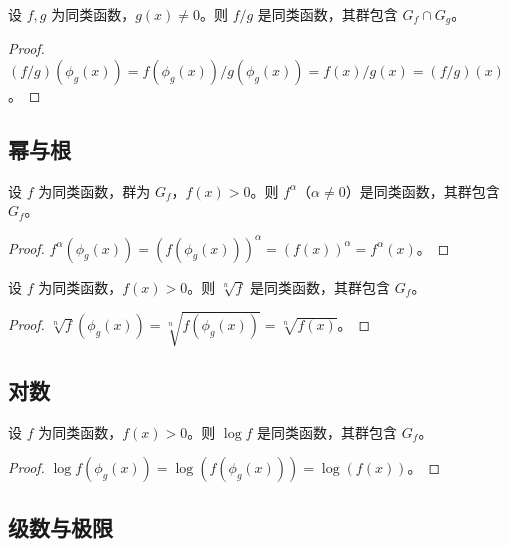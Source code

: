 \begin{proposition}[除法下各性质的传递性]\label{prop:division_all}
设 $f, g$ 为同类函数，$g(x) \neq 0$。则 $f/g$ 是同类函数，其群包含 $G_f \cap G_g$。
\end{proposition}

\begin{proof}
$(f/g)(\phi_g(x)) = f(\phi_g(x))/g(\phi_g(x)) = f(x)/g(x) = (f/g)(x)$。
\end{proof}

\subsection{幂与根}

\begin{proposition}[幂运算下各性质的传递性]\label{prop:power_all}
设 $f$ 为同类函数，群为 $G_f$，$f(x) > 0$。则 $f^\alpha$（$\alpha \neq 0$）是同类函数，其群包含 $G_f$。
\end{proposition}

\begin{proof}
$f^\alpha(\phi_g(x)) = (f(\phi_g(x)))^\alpha = (f(x))^\alpha = f^\alpha(x)$。
\end{proof}

\begin{proposition}[根运算下各性质的传递性]\label{prop:root_all}
设 $f$ 为同类函数，$f(x) > 0$。则 $\sqrt[n]{f}$ 是同类函数，其群包含 $G_f$。
\end{proposition}

\begin{proof}
$\sqrt[n]{f}(\phi_g(x)) = \sqrt[n]{f(\phi_g(x))} = \sqrt[n]{f(x)}$。
\end{proof}

\subsection{对数}

\begin{proposition}[对数运算下各性质的传递性]\label{prop:log_all}
设 $f$ 为同类函数，$f(x) > 0$。则 $\log f$ 是同类函数，其群包含 $G_f$。
\end{proposition}

\begin{proof}
$\log f(\phi_g(x)) = \log(f(\phi_g(x))) = \log(f(x))$。
\end{proof}

\subsection{级数与极限}

